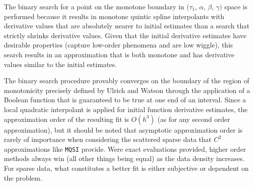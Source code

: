 The binary search for a point on the monotone boundary in $(\tau_1$,
$\alpha$, $\beta$, $\gamma)$ space is performed because it results in
monotone quintic spline interpolants with derivative values that are
absolutely nearer to initial estimates than a search that strictly
shrinks derivative values. Given that the initial derivative estimates
have desirable properties (capture low-order phenomena and are low
wiggle), this search results in an approximation that is both monotone
and has derivative values similar to the initial estimates.

The binary search procedure provably converges on the boundary of the
region of monotonicity precisely defined by Ulrich and Watson
\cite{ulrich1994positivity} through the application of a Boolean
function that is guaranteed to be true at one end of an
interval. Since a local quadratic interpolant is applied for initial
function derivative estimates, the approximation order of the
resulting fit is $O(h^3)$ (as for any second order approximation), but
it should be noted that asymptotic approximation order is rarely of
importance when considering the scattered sparse data that $C^2$
approximations like {\tt MQSI} provide. Were exact evaluations
provided, higher order methods always win (all other things being
equal) as the data density increases. For sparse data, what
constitutes a better fit is either subjective or dependent on the
problem.
